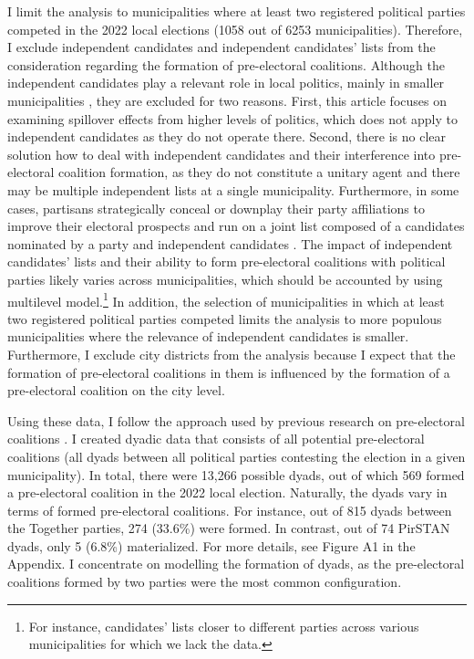 \documentclass[]{interact}
\theoremstyle{plain}%
\theoremstyle{definition}
\theoremstyle{remark}
\begin{document}
I limit the analysis to municipalities where at least two registered political parties competed in the 2022 local elections (1058 out of 6253 municipalities). Therefore, I exclude independent candidates and independent candidates' lists from the consideration regarding the formation of pre-electoral coalitions. Although the independent candidates play a relevant role in local politics, mainly in smaller municipalities \citep{kostelecky2023}, they are excluded for two reasons. First, this article focuses on examining spillover effects from higher levels of politics, which does not apply to independent candidates as they do not operate there. Second, there is no clear solution how to deal with independent candidates and their interference into pre-electoral coalition formation, as they do not constitute a unitary agent and there may be multiple independent lists at a single municipality. Furthermore, in some cases, partisans strategically conceal or downplay their party affiliations to improve their electoral prospects and run on a joint list composed of a candidates nominated by a party and independent candidates \citep[503]{kostelecky2023,gendzwill2012}. The impact of independent candidates' lists and their ability to form pre-electoral coalitions with political parties likely varies across municipalities, which should be accounted by using multilevel model.\footnote{For instance, candidates' lists closer to different parties across various municipalities for which we lack the data.} 
In addition, the selection of municipalities in which at least two registered political parties competed limits the analysis to more populous municipalities where the relevance of independent candidates is smaller. Furthermore, I exclude city districts from the analysis because I expect that the formation of pre-electoral coalitions in them is influenced by the formation of a pre-electoral coalition on the city level. 

Using these data, I follow the approach used by previous research on pre-electoral coalitions \citep{golder2005,ibenskas2016}. I created dyadic data that consists of all potential pre-electoral coalitions (all dyads between all political parties contesting the election in a given municipality). In total, there were 13,266 possible dyads, out of which 569 formed a pre-electoral coalition in the 2022 local election. Naturally, the dyads vary in terms of formed pre-electoral coalitions. For instance, out of 815 dyads between the Together parties, 274 (33.6\%) were formed. In contrast, out of 74 PirSTAN dyads, only 5 (6.8\%) materialized. For more details, see Figure A1 in the Appendix. I concentrate on modelling the formation of dyads, as the pre-electoral coalitions formed by two parties were the most common configuration.
\end{document}
